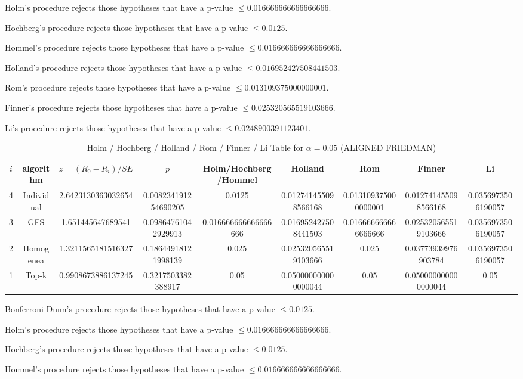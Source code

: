\documentclass[a4paper,10pt]{article}
\begin{document}
\begin{landscape}
Holm's procedure rejects those hypotheses that have a p-value $\le0.016666666666666666$.


Hochberg's procedure rejects those hypotheses that have a p-value $\le0.0125$.


Hommel's procedure rejects those hypotheses that have a p-value $\le0.016666666666666666$.


Holland's procedure rejects those hypotheses that have a p-value $\le0.016952427508441503$.


Rom's procedure rejects those hypotheses that have a p-value $\le0.013109375000000001$.


Finner's procedure rejects those hypotheses that have a p-value $\le0.025320565519103666$.


Li's procedure rejects those hypotheses that have a p-value $\le0.0248900391123401$.



\newpage

\begin{table}[!htp]
\centering\scriptsize
\caption{Holm / Hochberg / Holland / Rom / Finner / Li Table for $\alpha=0.05$ (ALIGNED FRIEDMAN)}
\begin{tabular}{ccccccccc}
$i$&algorithm&$z=(R_0 - R_i)/SE$&$p$&Holm/Hochberg/Hommel&Holland&Rom&Finner&Li\\
\hline
4&Individual&2.6423130363032654&0.008234191254690205&0.0125&0.012741455098566168&0.013109375000000001&0.012741455098566168&0.0356973506190057\\
3&GFS&1.651445647689541&0.09864761042929913&0.016666666666666666&0.016952427508441503&0.016666666666666666&0.025320565519103666&0.0356973506190057\\
2&Homogenea&1.3211565181516327&0.18644918121998139&0.025&0.025320565519103666&0.025&0.03773939976903784&0.0356973506190057\\
1&Top-k&0.9908673886137245&0.3217503382388917&0.05&0.050000000000000044&0.05&0.050000000000000044&0.05\\
\hline
\end{tabular}
\end{table}
Bonferroni-Dunn's procedure rejects those hypotheses that have a p-value $\le0.0125$.


Holm's procedure rejects those hypotheses that have a p-value $\le0.016666666666666666$.


Hochberg's procedure rejects those hypotheses that have a p-value $\le0.0125$.


Hommel's procedure rejects those hypotheses that have a p-value $\le0.016666666666666666$.



\end{landscape}
\end{document}
